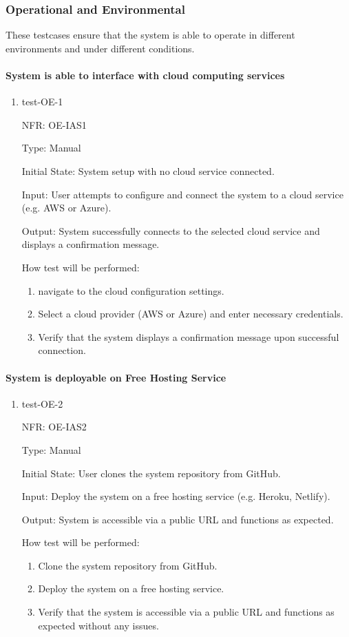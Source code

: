 \documentclass[12pt, titlepage]{article}
\begin{document}
\subsubsection{Operational and Environmental}
These testcases ensure that the system is able to operate in different environments and under different conditions.

\paragraph{System is able to interface with cloud computing services}
\begin{enumerate}
  \item{test-OE-1}

  NFR: OE-IAS1

  Type: Manual
            
  Initial State: System setup with no cloud service connected.
            
  Input:  User attempts to configure and connect the system to a cloud service (e.g. AWS or Azure).
            
  Output: System successfully connects to the selected cloud service and displays a confirmation message.
            
  How test will be performed: 
  \begin{enumerate}
    \item navigate to the cloud configuration settings.
    \item Select a cloud provider (AWS or Azure) and enter necessary credentials.
    \item Verify that the system displays a confirmation message upon successful connection.
  \end{enumerate}
\end{enumerate}

\paragraph{System is deployable on Free Hosting Service}
\begin{enumerate}
  \item{test-OE-2}

  NFR: OE-IAS2

  Type: Manual
            
  Initial State: User clones the system repository from GitHub.
            
  Input:  Deploy the system on a free hosting service (e.g. Heroku, Netlify).
            
  Output: System is accessible via a public URL and functions as expected.
            
  How test will be performed: 
  \begin{enumerate}
    \item Clone the system repository from GitHub.
    \item Deploy the system on a free hosting service.
    \item Verify that the system is accessible via a public URL and functions as expected without any issues.
  \end{enumerate}
\end{enumerate}
\end{document}
